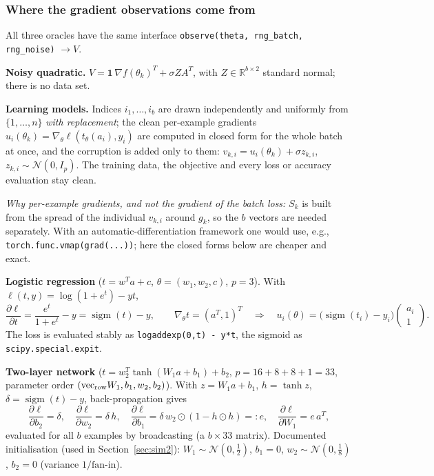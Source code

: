 \documentclass[11pt,a4paper]{article}
\begin{document}
\subsubsection*{Where the gradient observations come from}

All three oracles have the same interface \texttt{observe(theta, rng\_batch,
rng\_noise)} $\to V$.

\textbf{Noisy quadratic.} $V=\mathbf 1\,\nabla f(\theta_k)^T+\sigma ZA^T$, with
$Z\in\mathbb R^{b\times2}$ standard normal; there is no data set.

\textbf{Learning models.} Indices $i_1,\dots,i_b$ are drawn independently and
uniformly from $\{1,\dots,n\}$ \emph{with replacement}; the clean per-example
gradients $u_{i}(\theta_k)=\nabla_\theta\ell(t_\theta(a_{i}),y_{i})$ are computed in
closed form for the whole batch at once, and the corruption is added only to them:
$v_{k,i}=u_{i}(\theta_k)+\sigma z_{k,i}$, $z_{k,i}\sim\mathcal N(0,I_p)$. The training
data, the objective and every loss or accuracy evaluation stay clean.

\emph{Why per-example gradients, and not the gradient of the batch loss:} $S_k$ is
built from the spread of the individual $v_{k,i}$ around $g_k$, so the $b$ vectors are
needed separately. With an automatic-differentiation framework one would use, e.g.,
\texttt{torch.func.vmap(grad(...))}; here the closed forms below are cheaper and exact.

\textbf{Logistic regression} ($t=w^Ta+c$, $\theta=(w_1,w_2,c)$, $p=3$). With
$\ell(t,y)=\log(1+e^t)-yt$,
\begin{equation*}
\frac{\partial\ell}{\partial t}=\frac{e^t}{1+e^t}-y=\operatorname{sigm}(t)-y,\qquad
\nabla_\theta t=(a^T,1)^T\quad\Longrightarrow\quad
u_i(\theta)=\big(\operatorname{sigm}(t_i)-y_i\big)\begin{pmatrix}a_i\\1\end{pmatrix}.
\end{equation*}
The loss is evaluated stably as \texttt{logaddexp(0,t) - y*t}, the sigmoid as
\texttt{scipy.special.expit}.

\textbf{Two-layer network} ($t=w_2^T\tanh(W_1a+b_1)+b_2$, $p=16+8+8+1=33$, parameter
order $(\mathrm{vec}_{\rm row}W_1,b_1,w_2,b_2)$). With $z=W_1a+b_1$, $h=\tanh z$,
$\delta=\operatorname{sigm}(t)-y$, back-propagation gives
\begin{equation*}
\frac{\partial\ell}{\partial b_2}=\delta,\quad
\frac{\partial\ell}{\partial w_2}=\delta\,h,\quad
\frac{\partial\ell}{\partial b_1}=\delta\,w_2\odot(1-h\odot h)=:e,\quad
\frac{\partial\ell}{\partial W_1}=e\,a^T,
\end{equation*}
evaluated for all $b$ examples by broadcasting (a $b\times33$ matrix). Documented
initialisation (used in Section~\ref{sec:sim2}): $W_1\sim\mathcal N(0,\tfrac12)$, $b_1=0$,
$w_2\sim\mathcal N(0,\tfrac18)$, $b_2=0$ (variance $1/\text{fan-in}$).
\end{document}
